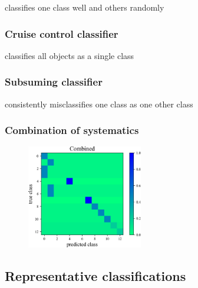 classifies one class well and others randomly

\subsubsection{Cruise control classifier}
\label{sec:cruise_data}

classifies all objects as a single class

\subsubsection{Subsuming classifier}
\label{sec:subsume_data}

consistently misclassifies one class as one other class

\subsubsection{Combination of systematics}
\label{sec:combo}

\begin{figure}
	\begin{center}
		\includegraphics[width=0.45\textwidth]{./fig/Combined.png}
		\caption{}
		\label{fig:combo_cm}
	\end{center}
\end{figure}

\subsection{Representative classifications}
\label{sec:realdata}



